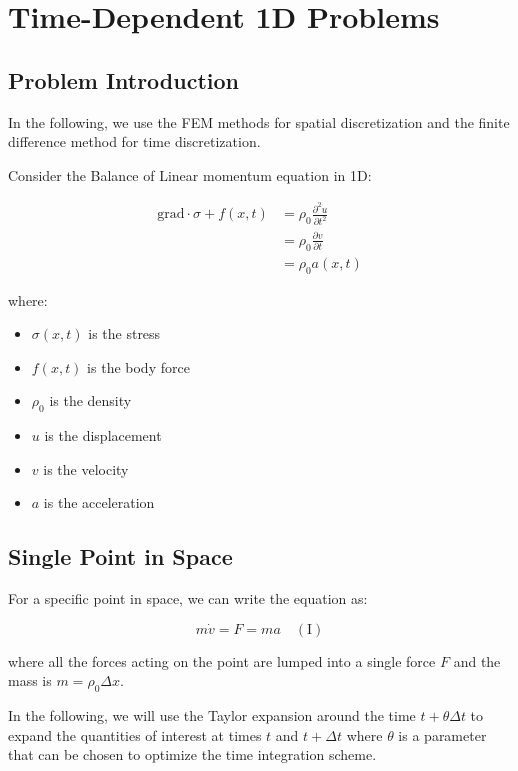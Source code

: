 \documentclass[
  11pt,
  a4paper,
]{scrbook}
\providecommand{\tightlist}{%
  \setlength{\itemsep}{0pt}\setlength{\parskip}{0pt}}\usepackage{longtable,booktabs,array}
\begin{document}
\chapter{Time-Dependent 1D Problems}\label{time-dependent-1d-problems}

\section{Problem Introduction}\label{problem-introduction}

In the following, we use the FEM methods for spatial discretization and
the finite difference method for time discretization.

Consider the Balance of Linear momentum equation in 1D:

\[
\begin{aligned}
\text{grad} \cdot \sigma+f(x,t)&=\rho_0\frac{\partial^2u}{\partial t^2} \\
&=\rho_0\frac{\partial v}{\partial t} \\
&=\rho_0 a(x,t)
\end{aligned}
\]

where:

\begin{itemize}
\tightlist
\item
  \(\sigma(x,t)\) is the stress
\item
  \(f(x,t)\) is the body force
\item
  \(\rho_0\) is the density
\item
  \(u\) is the displacement
\item
  \(v\) is the velocity
\item
  \(a\) is the acceleration
\end{itemize}

\section{Single Point in Space}\label{single-point-in-space}

For a specific point in space, we can write the equation as:

\[
m\dot{v} = F = ma \quad (\text{I})
\]

where all the forces acting on the point are lumped into a single force
\(F\) and the mass is \(m=\rho_0\Delta x\).

In the following, we will use the Taylor expansion around the time
\(t+\theta \Delta t\) to expand the quantities of interest at times
\(t\) and \(t+\Delta t\) where \(\theta\) is a parameter that can be
chosen to optimize the time integration scheme.
\end{document}
